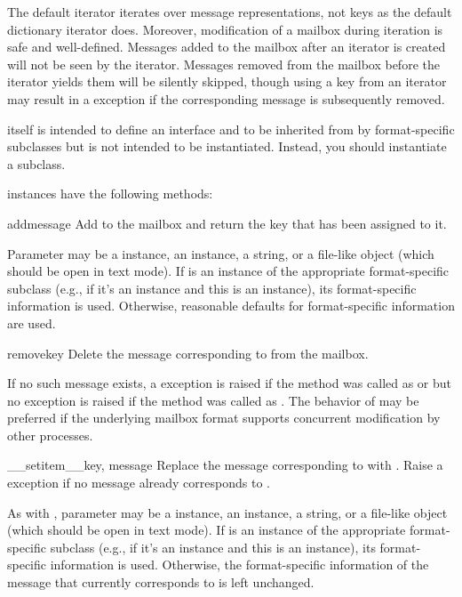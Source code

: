 The default  iterator iterates over message representations, not
keys as the default dictionary iterator does. Moreover, modification of a
mailbox during iteration is safe and well-defined. Messages added to the
mailbox after an iterator is created will not be seen by the iterator. Messages
removed from the mailbox before the iterator yields them will be silently
skipped, though using a key from an iterator may result in a
 exception if the corresponding message is subsequently
removed.

 itself is intended to define an interface and to be inherited
from by format-specific subclasses but is not intended to be instantiated.
Instead, you should instantiate a subclass.

 instances have the following methods:

\begin{methoddesc}{add}{message}
Add  to the mailbox and return the key that has been assigned to
it.

Parameter  may be a  instance, an
 instance, a string, or a file-like object (which
should be open in text mode). If  is an instance of the
appropriate format-specific  subclass (e.g., if it's an
 instance and this is an  instance), its
format-specific information is used. Otherwise, reasonable defaults for
format-specific information are used.
\end{methoddesc}

\begin{methoddesc}{remove}{key}
Delete the message corresponding to  from the mailbox.

If no such message exists, a  exception is raised if the
method was called as  or  but no
exception is raised if the method was called as . The
behavior of  may be preferred if the underlying mailbox
format supports concurrent modification by other processes.
\end{methoddesc}

\begin{methoddesc}{__setitem__}{key, message}
Replace the message corresponding to  with . Raise a
 exception if no message already corresponds to .

As with , parameter  may be a 
instance, an  instance, a string, or a file-like
object (which should be open in text mode). If  is an instance of
the appropriate format-specific  subclass (e.g., if it's an
 instance and this is an  instance), its
format-specific information is used. Otherwise, the format-specific information
of the message that currently corresponds to  is left unchanged. 
\end{methoddesc}

